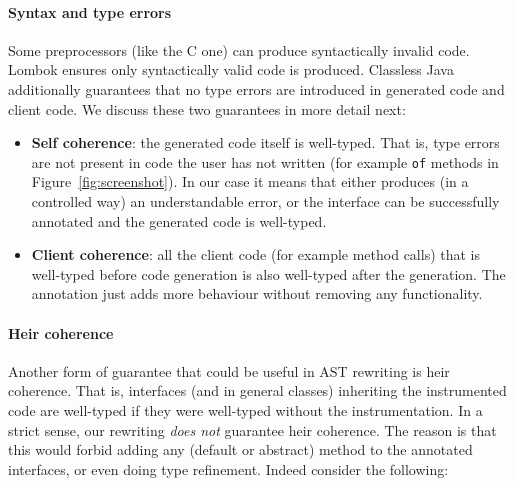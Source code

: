 


\paragraph{Syntax and type errors}
Some preprocessors (like the C one) can produce syntactically invalid code.
Lombok ensures only syntactically valid code is produced. %
Classless Java additionally guarantees that no type errors are introduced
in generated code and client code. We discuss these two guarantees in
more detail next:

\begin{itemize}

\item{\bf Self coherence}: the generated code itself is well-typed. That is,
  type errors are not present in code the user has not written (for
  example \texttt{of} methods in Figure~\ref{fig:screenshot}).
In our case it means that either \mixin{} produces (in a controlled way) an
understandable error, or the interface can be successfully annotated and the generated code is well-typed.

\item{\bf Client coherence}: all the client code (for example method calls)
  that is well-typed before code generation is also well-typed after the generation.
The annotation just adds more behaviour without removing any functionality.

\end{itemize}

\paragraph{Heir coherence} Another form of guarantee that could be
useful in AST rewriting is heir coherence. That is, interfaces
(and in general classes) inheriting the instrumented code are
well-typed if they were well-typed without the instrumentation.
In a strict sense, our rewriting \emph{does not} guarantee heir coherence.  The reason
is that this would forbid adding any (default or abstract) method to
the annotated interfaces, or even doing type refinement. Indeed consider
the following:

